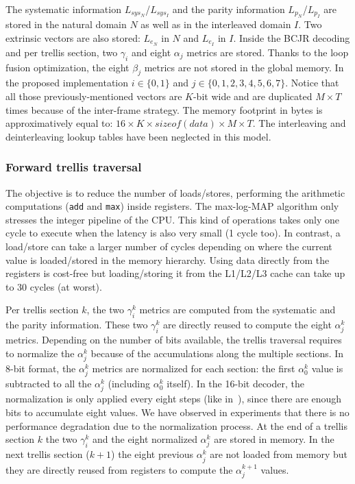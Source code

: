 The systematic information $L_{sys_N}$/$L_{sys_I}$ and the parity information
$L_{p_N}$/$L_{p_I}$  are stored in the natural domain $N$ as well as in the
interleaved domain $I$. Two extrinsic vectors are also stored: $L_{e_N}$ in $N$
and $L_{e_I}$ in $I$. Inside the BCJR decoding and per trellis section, two
$\gamma_{i}$ and eight $\alpha_{j}$ metrics are stored. Thanks to the loop
fusion optimization, the eight $\beta_j$ metrics are not stored in the global
memory. In the proposed implementation $i \in \{0,1\}$ and
$j \in \{0,1,2,3,4,5,6,7\}$. Notice that all those previously-mentioned vectors
are $K$-bit wide and are duplicated $M\times T$ times because of the inter-frame
strategy. The memory footprint in bytes is approximatively equal to:
$16 \times K \times sizeof(data) \times M \times T$.
The interleaving and deinterleaving lookup tables have been neglected in this
model.

\subsubsection{Forward trellis traversal}

The objective is to reduce the number of loads/stores, performing the arithmetic
computations (\verb|add| and \verb|max|) inside registers. The max-log-MAP
algorithm only stresses the integer pipeline of the CPU. This kind of operations
takes only one cycle to execute when the latency is also very small (1 cycle
too). In contrast, a load/store can take a larger number of cycles depending on
where the current value is loaded/stored in the memory hierarchy. Using data
directly from the registers is cost-free but loading/storing it from the
L1/L2/L3 cache can take up to 30 cycles (at worst).

Per trellis section $k$, the two $\gamma_i^k$ metrics are computed from the
systematic and the parity information. These two $\gamma_i^k$ are directly
reused to compute the eight $\alpha_j^k$ metrics. Depending on the number of
bits available, the trellis traversal requires to normalize the $\alpha_j^k$
because of the accumulations along the multiple sections.  In 8-bit format, the
$\alpha_j^k$ metrics are normalized for each section: the first $\alpha_0^k$
value is subtracted to all the $\alpha_j^k$ (including $\alpha_0^k$ itself). In
the 16-bit decoder, the normalization is only applied every eight steps (like
in~\cite{Wu2013}), since there are enough bits to accumulate eight values. We
have observed in experiments that there is no performance degradation due to the
normalization process. At the end of a trellis section $k$ the two $\gamma_i^k$
and the eight normalized $\alpha_j^k$ are stored in  memory. In the next trellis
section ($k+1$) the eight previous $\alpha_j^k$ are not loaded from memory but
they are directly reused from registers to compute the $\alpha_j^{k+1}$ values.

